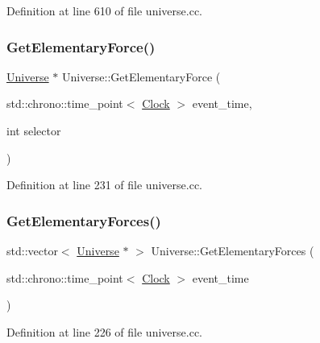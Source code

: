 Definition at line 610 of file universe.\+cc.

\mbox{\label{class_universe_a9506017d944cb64e67567477c1505a53}} 
\subsubsection{\texorpdfstring{Get\+Elementary\+Force()}{GetElementaryForce()}}
{\footnotesize\ttfamily \mbox{\hyperlink{class_universe}{Universe}} $\ast$ Universe\+::\+Get\+Elementary\+Force (\begin{DoxyParamCaption}\item[{std\+::chrono\+::time\+\_\+point$<$ \mbox{\hyperlink{universe_8h_a0ef8d951d1ca5ab3cfaf7ab4c7a6fd80}{Clock}} $>$}]{event\+\_\+time,  }\item[{int}]{selector }\end{DoxyParamCaption})}



Definition at line 231 of file universe.\+cc.

\mbox{\label{class_universe_a6a8ed579b2eedd3aceebda9f3d78aa0e}} 
\subsubsection{\texorpdfstring{Get\+Elementary\+Forces()}{GetElementaryForces()}}
{\footnotesize\ttfamily std\+::vector$<$ \mbox{\hyperlink{class_universe}{Universe}} $\ast$ $>$ Universe\+::\+Get\+Elementary\+Forces (\begin{DoxyParamCaption}\item[{std\+::chrono\+::time\+\_\+point$<$ \mbox{\hyperlink{universe_8h_a0ef8d951d1ca5ab3cfaf7ab4c7a6fd80}{Clock}} $>$}]{event\+\_\+time }\end{DoxyParamCaption})}



Definition at line 226 of file universe.\+cc.

\mbox{\label{class_universe_acef54e17666d17078c522388f8f6e4f9}} 
